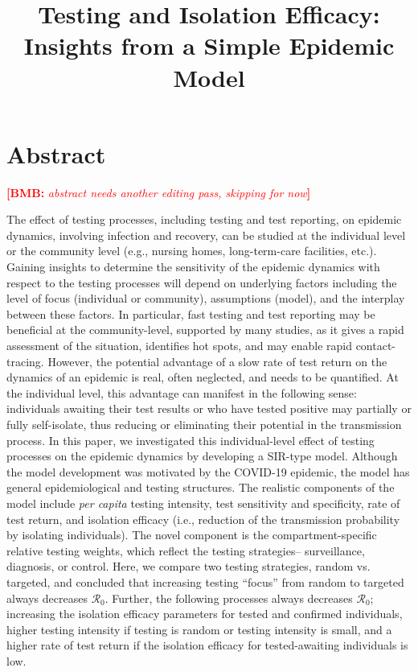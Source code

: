 \documentclass[12pt]{article}
\title{Testing and Isolation Efficacy: Insights from a Simple Epidemic Model}
\newcommand{\percap}{\emph{per capita}\xspace}
\newcommand{\Rnum}{\ensuremath{\mathcal{R}_0}\xspace}
\newcommand{\covid}{COVID-19\xspace}
\DeclareRobustCommand\_{\ifmmode\expandafter\subtxt\else\textunderscore\fi}
\newcommand{\comment}{\showcomment}
\newcommand{\showcomment}[3]{\textcolor{#1}{\textbf{[#2: }\textsl{#3}\textbf{]}}}
\newcommand{\bmb}[1]{\comment{red}{BMB}{#1}}
\theoremstyle{definition} %
\begin{document}
\maketitle

\linenumbers

\section{Abstract}

\bmb{abstract needs another editing pass, skipping for now}

The effect of testing processes, including testing and test reporting, on epidemic dynamics, involving infection and recovery, can be studied at the individual level or the community level (e.g., nursing homes, long-term-care facilities, etc.).
Gaining insights to determine the sensitivity of the epidemic dynamics with respect to the testing processes will depend on underlying factors including the level of focus (individual or community), assumptions (model), and the interplay between these factors. 
In particular, fast testing and test reporting may be beneficial at the community-level, supported by many studies, as it gives a rapid assessment of the situation, identifies hot spots, and may enable rapid contact-tracing. However, the potential advantage of a slow rate of test return on the dynamics of an epidemic is real, often neglected, and needs to be quantified. At the individual level, this advantage can manifest in the following sense: individuals awaiting their test results or who have tested positive may partially or fully self-isolate, thus reducing or eliminating their potential in the transmission process.
In this paper, we investigated this individual-level effect of testing processes on the epidemic dynamics by developing a SIR-type model.
Although the model development was motivated by the \covid epidemic, the model has general epidemiological and testing structures. The realistic components of the model include \percap testing intensity, test sensitivity and specificity, rate of test return, and isolation efficacy (i.e., reduction of the transmission probability by isolating individuals). The novel component is the compartment-specific relative testing weights, which reflect the testing strategies-- surveillance, diagnosis, or control. Here, we compare two testing strategies, random vs. targeted, and concluded that increasing testing “focus” from random to targeted always decreases \Rnum. Further, the following processes always decreases $\Rnum$; increasing the isolation efficacy parameters for tested and confirmed individuals, higher testing intensity if testing is random or testing intensity is small, and a higher rate of test return if the isolation efficacy for tested-awaiting individuals is low.
\end{document}

